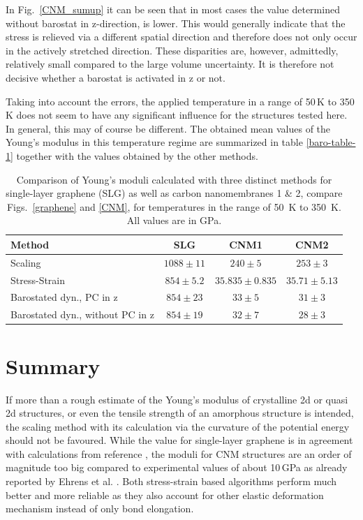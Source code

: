 \documentclass[preprint,12pt]{elsarticle}
\newcommand{\xref}[1]{\protect\ref{#1}}
\newcommand{\figref}[1]{Fig.~\protect\ref{#1}}
\begin{document}
In \figref{CNM_sumup} it can be seen that in most cases the value determined 
without barostat in z-direction, is lower. This would generally 
indicate that the stress is relieved via a different spatial direction 
and therefore does not only occur in the actively stretched direction. 
These disparities are, however, admittedly, relatively small compared 
to the large volume uncertainty. It is therefore not decisive whether a 
barostat is activated in z or not. 

Taking into account the errors, the applied temperature in a range of 50\,K to 350\,K 
does not seem to have any significant influence for the structures tested here. 
In general, this may of course be different.
The obtained mean values of the Young's modulus in this temperature regime are 
summarized in table \xref{baro-table-1} together with the values 
obtained by the other methods.

\begin{table}[h!]
\centering
\caption{\label{baro-table-1}
Comparison of Young's moduli calculated with three distinct methods
for single-layer graphene (SLG) as well as carbon nanomembranes 1 \& 2, 
compare Figs.~\xref{graphene} and \xref{CNM}, for temperatures in the range of 50~K to 350~K.
All values are in GPa.} 
\begin{tabular}{|l|c|c|c|} %
\hline
\textbf{Method} & \textbf{SLG} & \textbf{CNM1} & \textbf{CNM2} \\
\hline
Scaling           &     $1088\pm11$        &    $240\pm5$         &     $253\pm3$  \\
\hline
Stress-Strain     &   $854\pm5.2$          &     $35.835\pm0.835$        & $35.71\pm5.13$     \\
\hline
Barostated dyn., PC in z &     $854\pm23$        &     $33\pm5$        &  $31\pm3$   \\
\hline
Barostated dyn., without PC in z&   $854\pm19$          &  $32\pm7$ & $28\pm3$            \\
\hline
\end{tabular}
\label{table}
\end{table}

\section{Summary}
\label{summary}

If more than a rough estimate of the Young's modulus of crystalline 2d or quasi 2d structures, 
or even the tensile strength of an amorphous structure is intended, the scaling method 
with its calculation via the curvature of the potential energy should not be favoured. 
While the value for single-layer graphene is in agreement with calculations from reference \cite{GEH:PE18}, 
the moduli for CNM structures are an order of magnitude too big compared to experimental 
values of about 10\,GPa \cite{ZBG:B11} as already reported by Ehrens et al. \cite{EGV:PRB21}. 
Both stress-strain based algorithms perform much better and more reliable 
as they also account for other elastic deformation mechanism instead of only bond elongation. 
\end{document}
